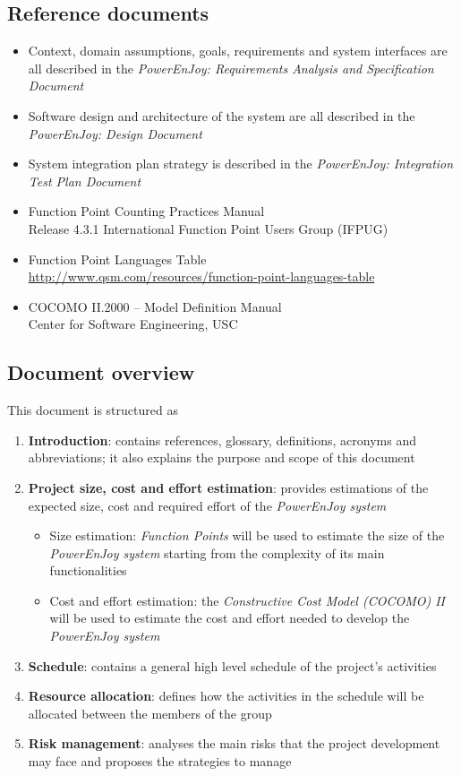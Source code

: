 \subsection{Reference documents}
\begin{itemize}
	\item Context, domain assumptions, goals, requirements and system interfaces are all described in the \emph{PowerEnJoy: Requirements Analysis and Specification Document} \cite{RASD}
	\item Software design and architecture of the system are all described in the \emph{PowerEnJoy: Design Document} \cite{DD}
	\item System integration plan strategy is described in the \emph{PowerEnJoy: Integration Test Plan Document} \cite{ITPD}
	\item Function Point Counting Practices Manual \\ 
Release 4.3.1 International Function Point Users Group (IFPUG)
	\item Function Point Languages Table \\ 
\url{http://www.qsm.com/resources/function-point-languages-table}
	\item COCOMO II.2000 – Model Definition Manual \\
Center for Software Engineering, USC

\end{itemize}


\subsection{Document overview}
This document is structured as
\begin{enumerate}
	\item \textbf{Introduction}: contains references, glossary, definitions, acronyms and abbreviations; it also explains the purpose and scope of this document
	\item \textbf{Project size, cost and effort estimation}: provides estimations of the expected size, cost and required effort of the \emph{PowerEnJoy system}
	\begin{itemize}
		\item Size estimation: \emph{Function Points} will be used to estimate the size of the \emph{PowerEnJoy system} starting from the complexity of its main functionalities
		\item Cost and effort estimation: the \emph{Constructive Cost Model (COCOMO) II} will be used to estimate the cost and effort needed to develop the \emph{PowerEnJoy system}
	\end{itemize}
	\item \textbf{Schedule}: contains a general high level schedule of the project's activities
	\item \textbf{Resource allocation}: defines how the activities in the schedule will be allocated between the members of the group
	\item \textbf{Risk management}: analyses the main risks that the project development may face and proposes the strategies to manage 
\end{enumerate}